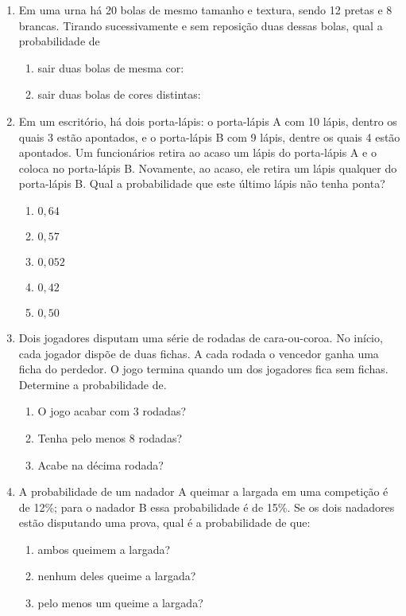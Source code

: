 \documentclass[twocolumn,oneside,a4paper,12pt]{article}
\begin{document}
\begin{enumerate}
\item Em uma urna há 20 bolas de mesmo tamanho e textura, sendo 12 pretas e 8 brancas. Tirando sucessivamente e sem reposição duas dessas bolas, qual a probabilidade de
\begin{enumerate}
\item sair duas bolas de mesma cor:
\item sair duas bolas de cores distintas:
\end{enumerate}

\item Em um escritório, há dois porta-lápis: o porta-lápis A com 10 lápis, dentro os quais 3 estão apontados, e o porta-lápis B com 9 lápis, dentre os quais 4 estão apontados. Um funcionários retira ao acaso um lápis do porta-lápis A e o coloca no porta-lápis B. Novamente, ao acaso, ele retira um lápis qualquer do porta-lápis B. Qual a probabilidade que este último lápis não tenha ponta? 

\begin{enumerate}
\item \(0,64\)
\item \(0,57\)
\item \(0,052\)
\item \(0,42\)
\item \(0,50\)
\end{enumerate}

\item Dois jogadores disputam uma série de rodadas de cara-ou-coroa. No início, cada jogador dispõe de duas fichas. A cada rodada o vencedor ganha uma ficha do perdedor. O jogo termina quando um dos jogadores fica sem fichas. Determine a probabilidade de.
\begin{enumerate}
\item O jogo acabar com 3 rodadas?
\item Tenha pelo menos 8 rodadas?
\item Acabe na décima rodada? 
\end{enumerate}

\item A probabilidade de um nadador A queimar a largada em uma competição é de 12\%; para o nadador B essa probabilidade é de 15\%. Se os dois nadadores estão disputando uma prova, qual é a probabilidade de que:   
\begin{enumerate}
\item ambos queimem a largada?
\item nenhum deles queime a largada?
\item pelo menos um queime a largada? 
\end{enumerate}

\end{enumerate}

\FRASE
\end{document}
